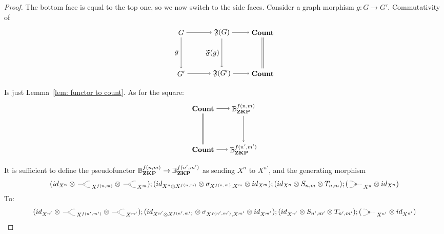 \begin{proof}
  The bottom face is equal to the top one, so we now switch to 
  the side faces. Consider a graph morphism $g:G \to G'$.
  Commutativity of 
  \begin{equation*}
    \begin{tikzpicture}
      \node (G') at (-2,0) {$G'$}; 
      \node (G) at (-2,2) {$G$};
      \node (FG') at (0,0) {$\Free{G'}$}; 
      \node (FG) at (0,2) {$\Free{G}$};
      \node (Count') at (2,0) {$\Count$};
      \node (Count) at (2,2) {$\Count$};
      \draw[->] (G) -- node[left] {$g$} (G');
      \draw[->] (G) -- (FG);
      \draw[->] (G') -- (FG');
      \draw[->] (FG) -- node[left] {$\Free{g}$} (FG');
      \draw[->] (FG) -- (Count);
      \draw[->] (FG') -- (Count');
      \draw[transform canvas={xshift=-1pt}, -] (Count) -- (Count');
      \draw[transform canvas={xshift=1pt}, -] (Count) -- (Count');
    \end{tikzpicture}
  \end{equation*}
  Is just Lemma~\ref{lem: functor to count}. As for the square:
  \begin{equation*}
    \begin{tikzpicture}
      \node (Count) at (0,2) {$\Count$};
      \node (Count') at (0,0) {$\Count$};
      \node (Bzkp) at (2,2) {$\Bzkp{f(n,m)}$}; 
      \node (Bzkp') at (2,0) {$\Bzkp{f(n',m')}$}; 
      \draw[->] (Count) -- (Bzkp);
      \draw[->] (Count') -- (Bzkp');
      \draw[->] (Bzkp) -- (Bzkp');
      \draw[transform canvas={xshift=-1pt}, -] (Count) -- (Count');
      \draw[transform canvas={xshift=1pt}, -] (Count) -- (Count');
    \end{tikzpicture}
  \end{equation*}
  It is sufficient to define the pseudofunctor 
  $\mathbb{B}^{f(n,m)}_\textbf{ZKP} \to \mathbb{B}^{f(n', m')}_\textbf{ZKP}$ as sending 
  $X^n$ to $X^{n'}$, and the generating morphism
  \begin{equation*}
    (\Id{X^n} \Tensor \COPYSym_{X^{f(n,m)}} \Tensor \COPYSym_{X^m});
    (\Id{X^n \Tensor X^{f(n,m)}} \Tensor \sigma_{X^{f(n,m)},X^m} \Tensor \Id{X^m});
    (\Id{X^n} \Tensor S_{n,m} \Tensor T_{n,m});(\MATCHSym_{X^n} \Tensor \Id{X^n})
  \end{equation*}
  To:
  \small{
  \begin{equation*}
    (\Id{X^{n'}} \Tensor \COPYSym_{X^{f(n',m')}} \Tensor \COPYSym_{X^{m'}});
    (\Id{X^{n'} \Tensor X^{f(n',m')}} \Tensor \sigma_{X^{f(n',m')},X^{m'}} \Tensor \Id{X^{m'}});
    (\Id{X^{n'}} \Tensor S_{n',m'} \Tensor T_{n',m'});(\MATCHSym_{X^{n'}} \Tensor \Id{X^{n'}})

\end{equation*}}
\end{proof}
